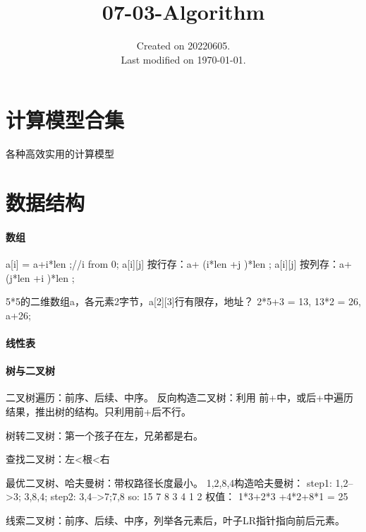 \documentclass[UTF8]{../computerUniverse}
\begin{document}
\title{07-03-Algorithm}
\date{Created on 20220605.\\   Last modified on \today.}
\maketitle
\tableofcontents








\chapter{计算模型合集}
各种高效实用的计算模型

\chapter{数据结构}










\subsubsection{数组}
 a[i] = a+i*len ;//i from 0;
 a[i][j]  按行存：a+ (i*len +j )*len ;
 a[i][j]  按列存：a+ (j*len +i )*len ;

 5*5的二维数组a，各元素2字节，a[2][3]行有限存，地址？
 2*5+3 = 13, 13*2 = 26, a+26;
\subsubsection{线性表}

\subsubsection{树与二叉树}

二叉树遍历：前序、后续、中序。
反向构造二叉树：利用 前+中，或后+中遍历结果，推出树的结构。只利用前+后不行。

树转二叉树：第一个孩子在左，兄弟都是右。

查找二叉树：左<根<右


最优二叉树、哈夫曼树：带权路径长度最小。 
1,2,8,4构造哈夫曼树：
step1: 1,2-->3; 3,8,4;
step2: 3,4-->7;7,8
so:        15
      7       8
   3    4
1    2
权值： 1*3+2*3 +4*2+8*1 = 25

线索二叉树：前序、后续、中序，列举各元素后，叶子LR指针指向前后元素。
\end{document}
